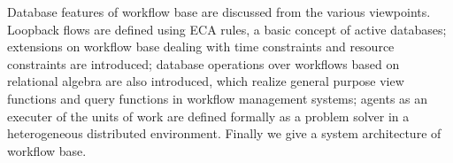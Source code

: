 Database features of workflow base are discussed from the various
viewpoints.  Loopback flows are defined using ECA rules, a basic concept
of active databases; extensions on workflow base dealing with time
constraints and resource constraints are introduced; database operations
over workflows based on relational algebra are also introduced, which
realize general purpose view functions and query functions in workflow
management systems; agents as an executer of the units of work are
defined formally as a problem solver in a heterogeneous distributed
environment.  Finally we give a system architecture of workflow base.
